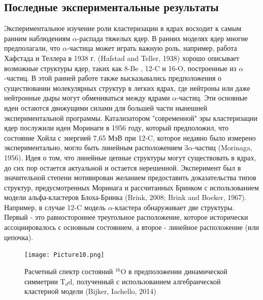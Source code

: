 \documentclass[fontsize=14pt]{scrarticle}
\begin{document}
\subsection{ Последные экспериментальные результаты}
\hspace{0.6cm}
Экспериментальное изучение роли кластеризации в ядрах восходит к самым ранним наблюдениям $\alpha$-распада тяжелых ядер. В ранних моделях ядер многие предполагали, что $\alpha$-частица может играть важную роль, например, работа Хафстада и Теллера в 1938 г. (Hafstad and Teller, 1938) хорошо описывает возможные структуры ядер, таких как 8-Be , 12-C и 16-O, построенные из $\alpha$-частиц. В этой ранней работе также высказывались предположения о существовании молекулярных структур в легких ядрах, где нейтроны или даже нейтронные дыры могут обмениваться между ядрами $\alpha$-частиц. Эти основные идеи остаются движущими силами для большей части нынешней экспериментальной программы. Катализатором "современной" эры кластеризации ядер послужили идеи Моринаги в 1956 году, который предположил, что состояние Хойла с энергией 7,65 МэВ при 12-C, которое недавно было измерено экспериментально, могло быть линейным расположением 3$\alpha$-частиц (Morinaga, 1956). Идея о том, что линейные цепные структуры могут существовать в ядрах, до сих пор остается актуальной и остается нерешенной. Эксперимент был в значительной степени мотивирован желанием предоставить доказательства типов структур, предусмотренных Моринага и рассчитанных Бринком с использованием модели альфа-кластеров Блоха-Бринка (Brink, 2008; Brink and Boeker, 1967). Например, в случае 12-C модель $\alpha$-кластера обнаруживает две структуры. Первый - это равностороннее треугольное расположение, которое исторически ассоциировалось с основным состоянием, а второе - линейное расположение (или цепочка).

\begin{figure}[!ht]
\texttt{[image: Picture10.png]}
\caption{Расчетный спектр состояний $^{16}$O в предположении динамической симметрии T$_{d}$d, полученный с использованием алгебраической кластерной модели (Bijker, Iachello, 2014)}
\label{fig10}
\end{figure}
\end{document}
